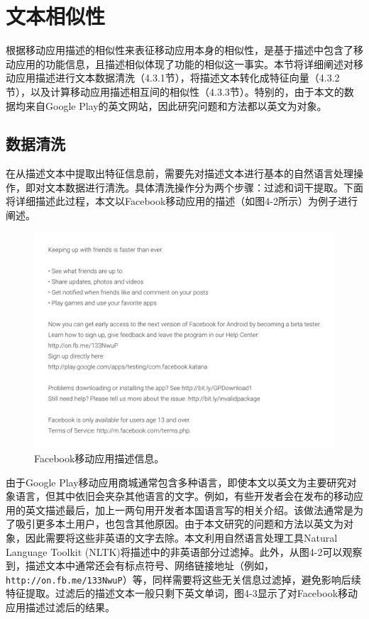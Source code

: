 \section{文本相似性}
根据移动应用描述的相似性来表征移动应用本身的相似性，是基于描述中包含了移动应用的功能信息，且描述相似体现了功能的相似这一事实。本节将详细阐述对移动应用描述进行文本数据清洗（4.3.1节），将描述文本转化成特征向量（4.3.2节），以及计算移动应用描述相互间的相似性（4.3.3节）。特别的，由于本文的数据均来自Google Play的英文网站，因此研究问题和方法都以英文为对象。


\subsection{数据清洗}
在从描述文本中提取出特征信息前，需要先对描述文本进行基本的自然语言处理操作，即对文本数据进行清洗。具体清洗操作分为两个步骤：过滤和词干提取。下面将详细描述此过程，本文以Facebook移动应用的描述（如图4-2所示）为例子进行阐述。

\begin{figure}
	\centering
	\includegraphics[width=4.7in]{figures/fb_desc}
	\caption{Facebook移动应用描述信息。}
\end{figure}

由于Google Play移动应用商城通常包含多种语言，即使本文以英文为主要研究对象语言，但其中依旧会夹杂其他语言的文字。例如，有些开发者会在发布的移动应用的英文描述最后，加上一两句用开发者本国语言写的相关介绍。该做法通常是为了吸引更多本土用户，也包含其他原因。由于本文研究的问题和方法以英文为对象，因此需要将这些非英语的文字去除。本文利用自然语言处理工具Natural Language Toolkit (NLTK)\cite{nltk}将描述中的非英语部分过滤掉。此外，从图4-2可以观察到，描述文本中通常还会有标点符号、网络链接地址（例如，\texttt{http://on.fb.me/133NwuP}）等，同样需要将这些无关信息过滤掉，避免影响后续特征提取。过滤后的描述文本一般只剩下英文单词，图4-3显示了对Facebook移动应用描述过滤后的结果。

